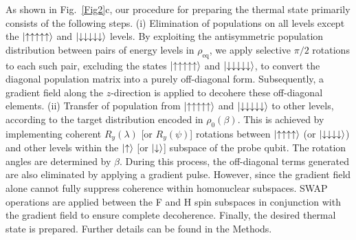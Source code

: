 \documentclass[aps,pra,twocolumn,superscriptaddress,preprintnumbers,amsmath,amssymb]{revtex4-2}
\begin{document}
As shown in Fig.~\ref{Fig2}c, our procedure for preparing the thermal state primarily consists of the following steps. (i) Elimination of populations on all levels except the \(\ket{\uparrow\uparrow\uparrow\uparrow\uparrow}\) and \(\ket{\downarrow\downarrow\downarrow\downarrow\downarrow}\) levels. By exploiting the antisymmetric population distribution between pairs of energy levels in $\rho_{\mathrm{eq}}$, we apply selective $\pi/2$ rotations to each such pair, excluding the states  \(\ket{\uparrow\uparrow\uparrow\uparrow\uparrow}\) and \(\ket{\downarrow\downarrow\downarrow\downarrow\downarrow}\), to convert the diagonal population matrix into a purely off-diagonal form. 
Subsequently, a gradient field along the $z$-direction is applied to decohere these off-diagonal elements. 
(ii) Transfer of population from  \(\ket{\uparrow\uparrow\uparrow\uparrow\uparrow}\) and \(\ket{\downarrow\downarrow\downarrow\downarrow\downarrow}\)  to other levels, according to the target distribution encoded in $\rho_{0}(\beta)$. This is achieved by implementing coherent $R_y(\lambda)$ [or $R_y(\psi)$] rotations between \(\ket{\uparrow\uparrow\uparrow\uparrow}\) (or \(\ket{\downarrow\downarrow\downarrow\downarrow}\)) and other levels within the $\ket{\uparrow}$ [or $\ket{\downarrow}$] subspace of the probe qubit. The rotation angles are determined by $\beta$. During this process, the off-diagonal terms generated are also eliminated by applying a gradient pulse. However, since the gradient field alone cannot fully suppress coherence within homonuclear subspaces. SWAP operations are applied between the F and H spin subspaces in conjunction with the gradient field to ensure complete decoherence. Finally, the desired thermal state is prepared. Further details can be found in the Methods.\par
\end{document}
